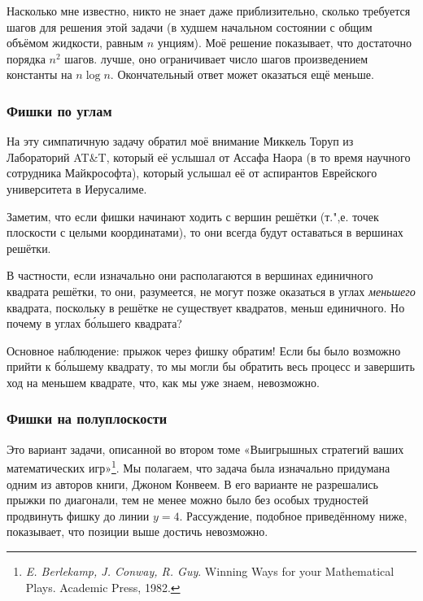 \documentclass[twoside]{book}
\begin{document}
Насколько мне известно, никто не знает даже приблизительно, сколько требуется шагов для решения этой задачи (в худшем начальном состоянии с общим объёмом жидкости, равным $n$ унциям).
Моё решение показывает, что достаточно порядка $n^2$ шагов.
 лучше, оно ограничивает число шагов произведением константы на $n\log n$.
Окончательный ответ может оказаться ещё меньше.

\subsubsection*{Фишки по углам}%

На эту симпатичную задачу обратил моё внимание Миккель Торуп из Лабораторий AT\&T, %
который её услышал от Ассафа Наора %
(в то время научного сотрудника Майкрософта), который услышал её от аспирантов Еврейского университета в Иерусалиме.


Заметим, что если фишки начинают ходить с вершин решётки (т.",е. точек плоскости с целыми координатами), то они всегда будут оставаться в вершинах решётки.

В частности, если изначально они располагаются в вершинах единичного квадрата решётки, то они, разумеется, не могут позже оказаться в углах \emph{меньшего} квадрата, поскольку в решётке не существует квадратов, меньш единичного.
Но почему  в углах б\'{о}льшего квадрата?

Основное наблюдение: прыжок через фишку обратим!
Если бы было возможно прийти к б\'{о}льшему квадрату, то мы могли бы обратить весь процесс и завершить ход на меньшем квадрате, что, как мы уже знаем, невозможно.
\heart

\subsubsection*{Фишки на полуплоскости}%

Это вариант задачи, описанной во втором томе «Выигрышных стратегий ваших математических игр»\footnote{\emph{E. Berlekamp, J. Conway, R. Guy}.
{Winning Ways for your Mathematical Plays.} Academic Press, 1982.}.
Мы полагаем, что задача была изначально придумана одним из авторов книги, Джоном Конвеем.
В его варианте не разрешались прыжки по диагонали, тем не менее можно было без особых трудностей продвинуть фишку до линии $y = 4$.
Рассуждение, подобное приведённому ниже, показывает, что позиции выше достичь невозможно.
\end{document}
